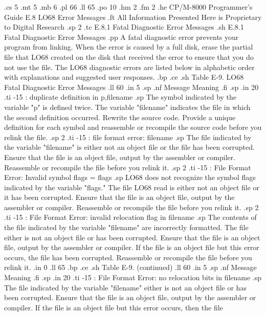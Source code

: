 .cs 5
.mt 5
.mb 6
.pl 66
.ll 65
.po 10
.hm 2
.fm 2
.he CP/M-8000 Programmer's Guide              E.8  LO68 Error Messages
.ft All Information Presented Here is Proprietary to Digital Research
.sp 2
.tc         E.8.1  Fatal Diagnostic Error Messages
.sh
E.8.1  Fatal Diagnostic Error Messages
.pp
A fatal diagnostic error prevents your program from linking.  When the error 
is caused by a full disk, erase the partial file that LO68 created on the 
disk that received the error to ensure that you do not use the file.  
The LO68 diagnostic errors are listed below in alphabetic order 
with explanations and suggested user responses.
.bp
.ce
.sh
Table E-9.  LO68 Fatal Diagnostic Error Messages
.ll 60
.in 5
.sp
.nf
Message        Meaning
.fi
.sp
.in 20
.ti -15
: duplicate definition in  p,filename
.sp
The symbol indicated by the variable "p" is defined twice.  
The variable "filename" indicates 
the file in which the second definition occurred.  Rewrite the source code.  
Provide a unique definition for each 
symbol and reassemble or recompile the source code before you relink the file.
.sp 2
.ti -15
: file format error:  filename
.sp
The file indicated by the variable "filename" is either not an 
object file or the file has been corrupted.  Ensure that the file is an 
object file, output by the assembler or 
compiler.  Reassemble or recompile the file before you relink it.
.sp 2
.ti -15
: File Format Error:  Invalid symbol flags = flags
.sp
LO68 does not recognize the symbol flags indicated by the variable
"flags."  The file LO68 read is either not an object file or it has been 
corrupted.  Ensure that the file is an object file, output by the assembler or 
compiler.  Reassemble or recompile the file before you relink it.
.sp 2
.ti -15
: File Format Error:  invalid relocation flag in filename
.sp
The contents of the file indicated by the variable 
"filename" are incorrectly formatted.  The file either is not an object file 
or has been corrupted.  Ensure that the file is an object file, output by the 
assembler or 
compiler.  If the file is an object file but this error occurs, the file
has been corrupted.  Reassemble or recompile the file before you relink it.
.in 0
.ll 65
.bp
.ce
.sh
Table E-9.  (continued)
.ll 60
.in 5
.sp
.nf
Message        Meaning
.fi
.sp
.in 20
.ti -15
: File Format Error:  no relocation bits in filename
.sp
The file indicated by the variable "filename" either is not an 
object file or has been corrupted.  Ensure that the file is an object file, 
output by the assembler or 
compiler.  If the file is an object file but this error occurs, then the file
